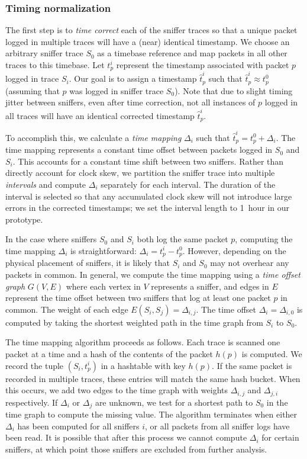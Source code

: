 \subsubsection{Timing normalization}

The first step is to {\em time correct} each of the sniffer traces so
that a unique packet logged in multiple traces will have a (near)
identical timestamp. We choose an arbitrary sniffer trace $S_0$ as
a timebase reference and map packets in all other traces to this timebase.
Let $t_p^i$ represent the timestamp associated with packet 
$p$ logged in trace $S_i$. 
Our goal is to assign a timestamp $\hat{t}_p^i$ such that $\hat{t}_p^i \approx
t_p^0$ (assuming that $p$ was logged in sniffer trace $S_0$).
Note that due to slight timing jitter between sniffers,
even after time correction, not all instances of $p$ logged in all
traces will have an identical corrected timestamp $\hat{t}_p^i$.

To accomplish this, we calculate a {\em time mapping} 
$\Delta_i$ such that $\hat{t}_p^i = t_p^0 + \Delta_i$. The time
mapping represents a constant time offset between packets logged 
in $S_0$ and $S_i$. This accounts for a constant time shift between
two sniffers. Rather than directly account for clock skew, we 
partition the sniffer trace into multiple {\em intervals} and
compute $\Delta_i$ separately for each interval. The duration of
the interval is selected so that any accumulated clock skew will not
introduce large errors in the corrected timestamps; we set the
interval length to 1~hour in our prototype.


In the case where sniffers $S_0$ and $S_i$ both log the same packet
$p$, computing the time mapping $\Delta_i$ is straightforward:
$\Delta_i = t_p^i - t_p^0$. However, depending on the physical
placement of sniffers, it is likely that $S_i$ and $S_0$ may not
overhear any packets in common. In general, we compute the time
mapping using a {\em time offset graph} $G(V,E)$ where each vertex 
in $V$ represents a sniffer, and edges in $E$ represent the time
offset between two sniffers that log at least one packet $p$ in
common. The weight of each edge $E(S_i,S_j) = \Delta_{i,j}$. 
The time offset $\Delta_i = \Delta_{i,0}$ is computed by taking 
the shortest weighted path in the time graph from $S_i$ to $S_0$.

The time mapping algorithm proceeds as follows. Each trace is
scanned one packet at a time and a hash of the contents of the packet 
$h(p)$ is computed. We record the tuple $(S_i, t_p^i)$ in a hashtable
with key $h(p)$. If the same packet is recorded in multiple traces, 
these entries will match the same hash bucket. When this occurs, we
add two edges to the time graph with weights $\Delta_{i,j}$ and
$\Delta_{j,i}$ respectively. If $\Delta_i$ or $\Delta_j$ are unknown,
we test for a shortest path to $S_0$ in the time graph to compute the
missing value. The algorithm terminates when either $\Delta_i$
has been computed for all sniffers $i$, or all packets from all
sniffer logs have been read. It is possible that after this process 
we cannot compute $\Delta_i$ for certain sniffers, at which 
point those sniffers are excluded from further analysis.

